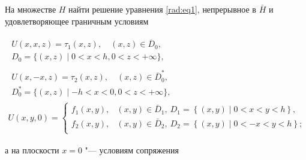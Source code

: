 \begin{task}[I]

На множестве $H$ найти решение уравнения {\rm \eqref{rad:eq1},} непрерывное в $\bar{H}$ и удовлетворяющее граничным условиям

\begin{gather}

\label{rad:eq2}

\begin{array}{c}

U(x,x,z)=\tau_1(x,z), \quad  (x,z)\in \overline D_0, \\  

D_0=\{(x,z) \mid 0<x<h, 0<z<+\infty\},

\end{array}

\\

\label{rad:eq4}

\begin{array}{c}

U(x,-x,z)=\tau_2(x,z), \quad  (x,z)\in \overline D_0^*, \\

D_0^*=\{(x,z) \mid -h<x<0, 0<z<+\infty\},

\end{array}

\\

\label{rad:eq4}

U(x, y, 0) =

\left\{

\begin{array}{ll}

f_{1}(x, y), &(x,y)\in \bar{D}_{1},~D_{1}= \left \{ (x, y) \mid 0<x<y<h\right\},\\

f_{2}(x, y), &(x,y)\in\bar{D}_{2},~D_{2}= \left \{ (x, y) \mid 0<-x<y<h\right\};\\

\end{array}

\right.

\end{gather}

а на плоскости $x = 0$ "--- условиям сопряжения

\begin{equation}

\label{rad:eq5}

\begin{array}{c}


\end{array}
\end{equation}
\end{task}
